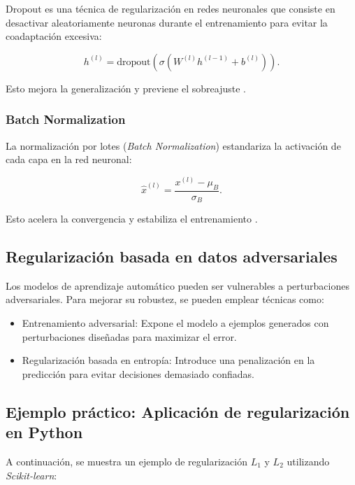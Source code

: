 \begin{itemize}
		Dropout es una técnica de regularización en redes neuronales que consiste en desactivar aleatoriamente neuronas durante el entrenamiento para evitar la coadaptación excesiva:
		
		\begin{equation}
			h^{(l)} = \text{dropout}(\sigma(W^{(l)} h^{(l-1)} + b^{(l)})).
		\end{equation}
		
		Esto mejora la generalización y previene el sobreajuste \cite{srivastava2014dropout}.
		
		\subsubsection{Batch Normalization}
		
		La normalización por lotes (\textit{Batch Normalization}) estandariza la activación de cada capa en la red neuronal:
		
		\begin{equation}
			\hat{x}^{(l)} = \frac{x^{(l)} - \mu_B}{\sigma_B}.
		\end{equation}
		
		Esto acelera la convergencia y estabiliza el entrenamiento \cite{ioffe2015batch}.
		
		\subsection{Regularización basada en datos adversariales}
		
		Los modelos de aprendizaje automático pueden ser vulnerables a perturbaciones adversariales. Para mejorar su robustez, se pueden emplear técnicas como:
		
		\begin{itemize}
			\item Entrenamiento adversarial: Expone el modelo a ejemplos generados con perturbaciones diseñadas para maximizar el error.
			\item Regularización basada en entropía: Introduce una penalización en la predicción para evitar decisiones demasiado confiadas.
		\end{itemize}
		
		\subsection{Ejemplo práctico: Aplicación de regularización en Python}
		
		A continuación, se muestra un ejemplo de regularización \( L_1 \) y \( L_2 \) utilizando \textit{Scikit-learn}:
		

\end{itemize}
